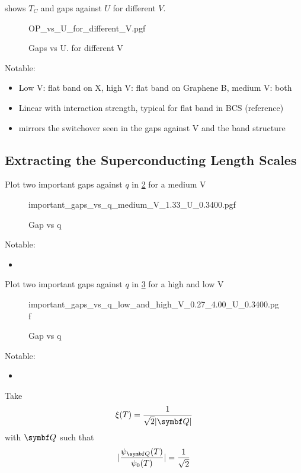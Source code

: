 \documentclass[../notes.tex]{subfiles}
\begin{document}
 shows \(T_C\) and gaps against \(U\) for different \(V\).
\begin{figure}[H]
	\centering
	{OP_vs_U_for_different_V.pgf}
	\caption{Gaps vs U. for different V} 
	\label{fig:decorated Graphene gaps against U for different V}
\end{figure}
Notable:
\begin{itemize}
	\item Low V: flat band on X, high V: flat band on Graphene B, medium V: both
	\item Linear with interaction strength, typical for flat band in BCS (reference)
	\item mirrors the switchover seen in the gaps against V and the band structure
\end{itemize}


\subsection*{Extracting the Superconducting Length Scales}

Plot two important gaps against \(q\) in \cref{fig:decorated graphene relevant gaps vs q for medium V} for a medium V
\begin{figure}[H]
	\centering
	{important_gaps_vs_q_medium_V_1.33_U_0.3400.pgf}
	\caption{Gap vs q}
	\label{fig:decorated graphene relevant gaps vs q for medium V}
\end{figure}
Notable:
\begin{itemize}
	\item
\end{itemize}
Plot two important gaps against \(q\) in \cref{fig:decorated graphene relevant gaps vs q for low and high V} for a high and low V
\begin{figure}[H]
	\centering
	{important_gaps_vs_q_low_and_high_V_0.27_4.00_U_0.3400.pgf}
	\caption{Gap vs q}
	\label{fig:decorated graphene relevant gaps vs q for low and high V}
\end{figure}
Notable:
\begin{itemize}
	\item
\end{itemize}
Take
\begin{equation}
	\xi(T) = \frac{1}{\sqrt{2} \vert \vb{Q} \vert}
\end{equation}
with \(\vb{Q}\) such that
\begin{equation}
	\vert \frac{\psi_{\vb{Q}}(T)}{\psi_0 (T)} \vert = \frac{1}{\sqrt{2}}
\end{equation}
\end{document}
